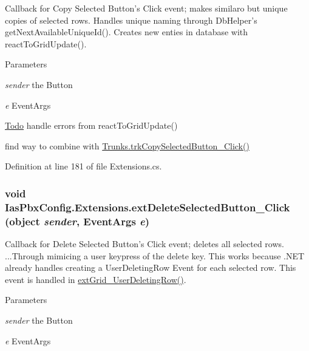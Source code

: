 Callback for Copy Selected Button's Click event; makes similaro but unique copies of selected rows. Handles unique naming through DbHelper's getNextAvailableUniqueId(). Creates new enties in database with reactToGridUpdate(). 
\begin{DoxyParams}{Parameters}
\item[{\em sender}]the Button \item[{\em e}]EventArgs \end{DoxyParams}
\begin{Desc}
\item[\hyperlink{todo__todo000035}{Todo}]handle errors from reactToGridUpdate() 

find way to combine with \hyperlink{class_ias_pbx_config_1_1_trunks_af34b4b2a4839c640dedb158ecd9b4756}{Trunks.trkCopySelectedButton\_\-Click()} \end{Desc}


Definition at line 181 of file Extensions.cs.\hypertarget{class_ias_pbx_config_1_1_extensions_a9a030fab8dd11091b79e69a1d7467392}{
\subsubsection[{extDeleteSelectedButton\_\-Click}]{\setlength{\rightskip}{0pt plus 5cm}void IasPbxConfig.Extensions.extDeleteSelectedButton\_\-Click (object {\em sender}, \/  EventArgs {\em e})}}
\label{class_ias_pbx_config_1_1_extensions_a9a030fab8dd11091b79e69a1d7467392}


Callback for Delete Selected Button's Click event; deletes all selected rows. ...Through mimicing a user keypress of the delete key. This works because .NET already handles creating a UserDeletingRow Event for each selected row. This event is handled in \hyperlink{class_ias_pbx_config_1_1_extensions_a4fc7cbae23f7bbfe872a5a88d057a85e}{extGrid\_\-UserDeletingRow()}. 
\begin{DoxyParams}{Parameters}
\item[{\em sender}]the Button \item[{\em e}]EventArgs \end{DoxyParams}


